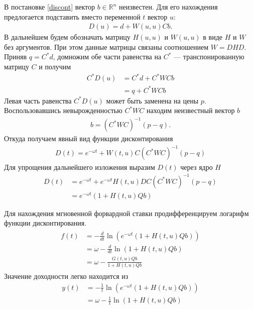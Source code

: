 \documentclass[10pt]{article}
\theoremstyle{definition}
\theoremstyle{remark}
\theoremstyle{plain}
\newcommand{\scalar}[2]{\left<#1,#2\right>}
\begin{document}
В постановке \eqref{discont} вектор $b\in \mathbb{R}^n$ неизвестен. Для его нахождения предлогается подставить вместо переменной $t$ вектор $u$:
\begin{align*}
D(u) = d + W(u,u)Cb. 
\end{align*}
В дальнейшем будем обозначать матрицу $H(u,u)$ и $W(u,u)$ в виде $H$ и $W$ без аргументов. При этом данные матрицы связаны соотношением $W=DHD$.
Приняв $q = C^* d$, домножим обе части равенства на $C^*$ --- транспонированную матрицу $C$ и получим 
\begin{align*}
C^*D(u)&= C^*d+C^*WCb\\
&= q+C^*WCb
\end{align*}
Левая часть равенства $C^* D(u)$ может быть заменена на цены $p$. Воспользовавшись невырожденностью $C^*WC$ находим неизвестный вектор $b$
\begin{align}
b = (C^*WC)^{-1}(p-q). \label{bVec}
\end{align}
Откуда получаем явный вид функции дисконтирования
\begin{align*}
D(t) = e^{-\omega t} + W(t,u)C(C^*WC)^{-1}(p-q)
\end{align*}
Для упрощения дальнейшего изложения выразим $D(t)$ через ядро $H$
\begin{align*}
D(t) 
&= e^{-\omega t} + e^{-\omega t} H(t,u)DC\left(C^*WC\right)^{-1}(p-q)\\
&= e^{-\omega t}\left(1+ H(t,u)Qb\right)
\end{align*}

%
Для нахождения мгновенной форвардной ставки продифференцируем логарифм функции дисконтирования.
\begin{align*}
	\begin{aligned}
	f(t) &= -\frac{d}{dt}\ln
	\left( e^{-\omega t}\left(1 + H(t,u)Qb\right) \right) 
	\\
	&= \omega - \frac{d}{dt}\ln\left(1 + H(t,u)Qb\right)
	\\
	&= \omega - \frac{G(t,u)Qb}{1 + H(t,u)Qb}	
	\end{aligned}
\end{align*}
Значение доходности легко находится из
\begin{align*}
y(t) &= - \frac{1}{t}\ln\left(
		e^{-\omega t}\left(1 + H(t,u)Qb\right)
	\right)\\
	&= \omega - \frac{1}{t}\ln\left(1 + H(t,u)Qb\right)
\end{align*}
\end{document}
